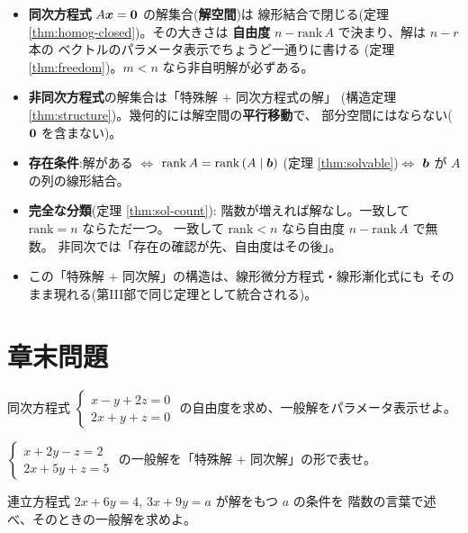 \begin{matome}
\begin{itemize}
\item \textbf{同次方程式} $A\bm{x} = \bm{0}$ の解集合(\textbf{解空間})は
線形結合で閉じる(定理 \ref{thm:homog-closed})。その大きさは
\textbf{自由度} $n - \mathrm{rank}\,A$ で決まり、解は $n - r$ 本の
ベクトルのパラメータ表示でちょうど一通りに書ける
(定理 \ref{thm:freedom})。$m < n$ なら非自明解が必ずある。
\item \textbf{非同次方程式}の解集合は「特殊解 $+$ 同次方程式の解」
(構造定理 \ref{thm:structure})。幾何的には解空間の\textbf{平行移動}で、
部分空間にはならない($\bm{0}$ を含まない)。
\item \textbf{存在条件}:解がある $\iff$
$\mathrm{rank}\,A = \mathrm{rank}\,(A \mid \bm{b})$
(定理 \ref{thm:solvable})$\iff$ $\bm{b}$ が $A$ の列の線形結合。
\item \textbf{完全な分類}(定理 \ref{thm:sol-count}):
階数が増えれば解なし。一致して $\mathrm{rank} = n$ ならただ一つ。
一致して $\mathrm{rank} < n$ なら自由度 $n - \mathrm{rank}\,A$ で無数。
非同次では「存在の確認が先、自由度はその後」。
\item この「特殊解 $+$ 同次解」の構造は、線形微分方程式・線形漸化式にも
そのまま現れる(第III部で同じ定理として統合される)。
\end{itemize}
\end{matome}

\section*{章末問題}

\begin{mondai}[基本]\label{q:sol-ex1}
同次方程式
$\begin{cases} x - y + 2z = 0 \\ 2x + y + z = 0 \end{cases}$
の自由度を求め、一般解をパラメータ表示せよ。
\end{mondai}

\begin{mondai}[基本]\label{q:sol-ex2}
$\begin{cases} x + 2y - z = 2 \\ 2x + 5y + z = 5 \end{cases}$
の一般解を「特殊解 $+$ 同次解」の形で表せ。
\end{mondai}

\begin{mondai}[基本]\label{q:sol-ex3}
連立方程式 $2x + 6y = 4$, $3x + 9y = a$ が解をもつ $a$ の条件を
階数の言葉で述べ、そのときの一般解を求めよ。
\end{mondai}

